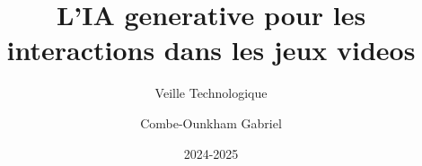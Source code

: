\documentclass[12pt, a4paper]{scrbook}
\title{ L'IA generative pour les interactions dans les jeux videos }
\subtitle{ Veille Technologique }         %
\author{ Combe-Ounkham Gabriel }
\date{2024-2025}
\begin{document}
\maketitle



\tableofcontents \clearpage

\listoffigures \clearpage

\listofalgorithms \clearpage

















\printbibliography


\end{document}
